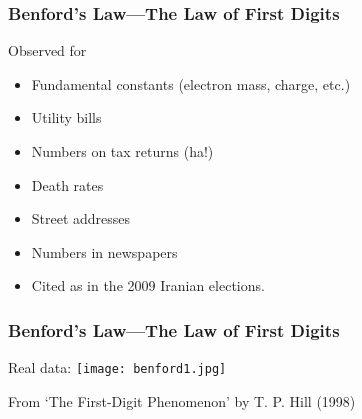 \begin{frame}
  \frametitle{Benford's Law---The Law of First Digits}

  \begin{block}{Observed for}
    \begin{itemize}
    \item<1->
        Fundamental constants (electron mass, charge, etc.)
    \item<1->
        Utility bills 
    \item<1->
        Numbers on tax returns (ha!)
    \item<1->
        Death rates 
    \item<1->
        Street addresses 
    \item<1->
        Numbers in newspapers 
    \end{itemize}
  \end{block}

  \begin{block}{}
    \begin{itemize}
    \item<2->
      Cited as 
      in the 2009 Iranian elections.
    \end{itemize}
  \end{block}

\end{frame}

\begin{frame}
  \frametitle{Benford's Law---The Law of First Digits}

  \begin{block}{Real data:}
  \texttt{[image: benford1.jpg]}

  {\small From `The First-Digit Phenomenon' by T. P. Hill (1998)\cite{hill1998a}}
  \end{block}




\end{frame}

